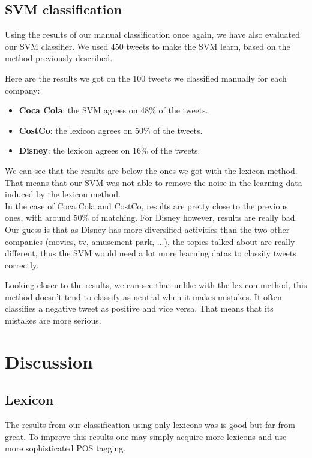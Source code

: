 \documentclass[a4paper,12pt]{report}
\begin{document}
\section{SVM classification}

Using the results  of our manual classification once again, we have also evaluated our SVM classifier.
We used 450 tweets to make the SVM learn, based on the method previously described.

Here are the results we got on the 100 tweets we classified manually for each company:
\begin{itemize}
        \item \textbf{Coca Cola}: the SVM agrees on 48\% of the tweets.
        \item \textbf{CostCo}: the lexicon agrees on 50\% of the tweets.
        \item \textbf{Disney}: the lexicon agrees on 16\% of the tweets.
\end{itemize}
We can see that the results are below the ones we got with the lexicon method.
That means that our SVM was not able to remove the noise in the learning data induced by the lexicon method.\\
In the case of Coca Cola and CostCo, results are pretty close to the previous ones, with around 50\% of matching.
For Disney however, results are really bad. Our guess is that as Disney has more diversified activities than the two other companies (movies, tv, amusement park, ...), the topics talked about are really different, thus the SVM would need a lot more learning datas to classify tweets correctly.

Looking closer to the results, we can see that unlike with the lexicon method, this method doesn't tend to classify as neutral when it makes mistakes.
It often classifies a negative tweet as positive and vice versa.
That means that its mistakes are more serious.


\chapter{Discussion}

\section{Lexicon}

The results from our classification using only lexicons was is good but far from great. To improve this results one may simply acquire more lexicons and use more sophisticated POS tagging.
\end{document}
